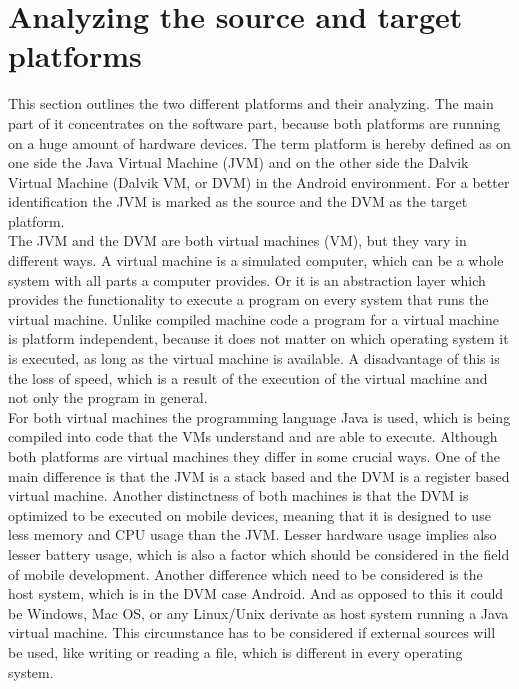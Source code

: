 \section{Analyzing the source and target platforms} 
\label{sec:migration:analysing-the-source-and-target-platform}
This section outlines the two different platforms and their analyzing.
The main part of it concentrates on the software part, because both platforms are running on a huge amount of hardware devices.
The term platform is hereby defined as on one side the Java Virtual Machine (JVM) and on the other side the Dalvik Virtual Machine (Dalvik VM, or DVM) in the Android environment.
For a better identification the JVM is marked as the source and the DVM as the target platform.
\\
The JVM and the DVM are both virtual machines (VM), but they vary in different ways.
A virtual machine is a simulated computer, which can be a whole system with all parts a computer provides.
Or it is an abstraction layer which provides the functionality to execute a program on every system that runs the virtual machine.
Unlike compiled machine code a program for a virtual machine is platform independent, because it does not matter on which operating system it is executed, as long as the virtual machine is available.
A disadvantage of this is the loss of speed, which is a result of the execution of the virtual machine and not only the program in general.~\cite{craig2006virtual}
\\
For both virtual machines the programming language Java is used, which is being compiled into code that the VMs understand and are able to execute.
Although both platforms are virtual machines they differ in some crucial ways.
One of the main difference is that the JVM is a stack based and the DVM is a register based virtual machine.
Another distinctness of both machines is that the DVM is optimized to be executed on mobile devices, meaning that it is designed to use less memory and CPU usage than the JVM.
Lesser hardware usage implies also lesser battery usage, which is also a factor which should be considered in the field of mobile development.
Another difference which need to be considered is the host system, which is in the DVM case Android.
And as opposed to this it could be Windows, Mac OS, or any Linux/Unix derivate as host system running a Java virtual machine. 
This circumstance has to be considered if external sources will be used, like writing or reading a file, which is different in every operating system.


